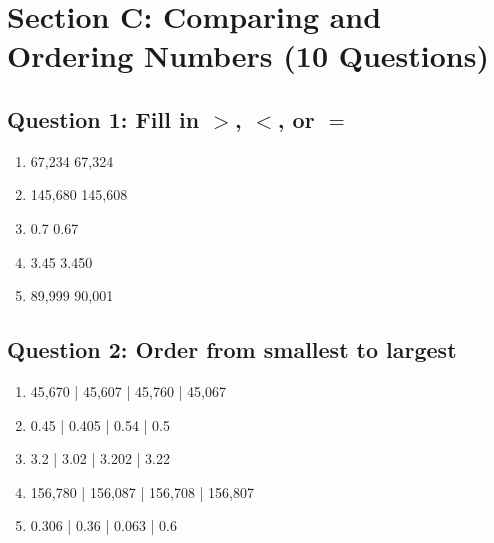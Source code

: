 \documentclass{article}
\begin{document}
\section{Section C: Comparing and Ordering Numbers (10 Questions)}

\subsection*{Question 1: Fill in $>$, $<$, or $=$}
\begin{enumerate}
    \item 67,234 \underline{\hspace{1cm}} 67,324
    \item 145,680 \underline{\hspace{1cm}} 145,608  
    \item 0.7 \underline{\hspace{1cm}} 0.67
    \item 3.45 \underline{\hspace{1cm}} 3.450
    \item 89,999 \underline{\hspace{1cm}} 90,001
\end{enumerate}

\subsection*{Question 2: Order from smallest to largest}
\begin{enumerate}
    \item 45,670 | 45,607 | 45,760 | 45,067
    
    \vspace{1cm}
    
    \item 0.45 | 0.405 | 0.54 | 0.5
    
    \vspace{1cm}
    
    \item 3.2 | 3.02 | 3.202 | 3.22
    
    \vspace{1cm}
    
    \item 156,780 | 156,087 | 156,708 | 156,807
    
    \vspace{1cm}
    
    \item 0.306 | 0.36 | 0.063 | 0.6
    
    \vspace{1cm}
\end{enumerate}
\end{document}

